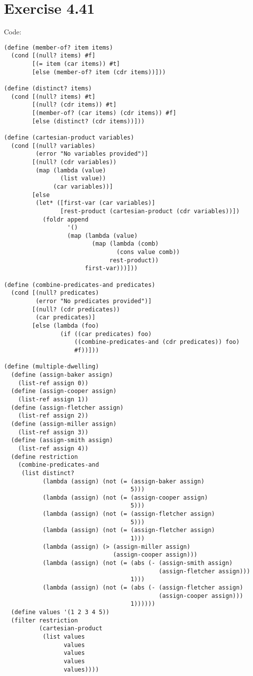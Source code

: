 \documentclass[../main.tex]{subfiles}
\begin{document}
\section{Exercise 4.41}

Code:

\begin{lstlisting}
(define (member-of? item items)
  (cond [(null? items) #f]
        [(= item (car items)) #t]
        [else (member-of? item (cdr items))]))

(define (distinct? items)
  (cond [(null? items) #t]
        [(null? (cdr items)) #t]
        [(member-of? (car items) (cdr items)) #f]
        [else (distinct? (cdr items))]))

(define (cartesian-product variables)
  (cond [(null? variables)
         (error "No variables provided")]
        [(null? (cdr variables))
         (map (lambda (value)
                (list value))
              (car variables))]
        [else
         (let* ([first-var (car variables)]
                [rest-product (cartesian-product (cdr variables))])
           (foldr append
                  '()
                  (map (lambda (value)
                         (map (lambda (comb)
                                (cons value comb))
                              rest-product))
                       first-var)))]))

(define (combine-predicates-and predicates)
  (cond [(null? predicates)
         (error "No predicates provided")]
        [(null? (cdr predicates))
         (car predicates)]
        [else (lambda (foo)
                (if ((car predicates) foo)
                    ((combine-predicates-and (cdr predicates)) foo)
                    #f))]))

(define (multiple-dwelling)
  (define (assign-baker assign)
    (list-ref assign 0))
  (define (assign-cooper assign)
    (list-ref assign 1))
  (define (assign-fletcher assign)
    (list-ref assign 2))
  (define (assign-miller assign)
    (list-ref assign 3))
  (define (assign-smith assign)
    (list-ref assign 4))
  (define restriction
    (combine-predicates-and
     (list distinct?
           (lambda (assign) (not (= (assign-baker assign)
                                    5)))
           (lambda (assign) (not (= (assign-cooper assign)
                                    5)))
           (lambda (assign) (not (= (assign-fletcher assign)
                                    5)))
           (lambda (assign) (not (= (assign-fletcher assign)
                                    1)))
           (lambda (assign) (> (assign-miller assign)
                               (assign-cooper assign)))
           (lambda (assign) (not (= (abs (- (assign-smith assign)
                                            (assign-fletcher assign)))
                                    1)))
           (lambda (assign) (not (= (abs (- (assign-fletcher assign)
                                            (assign-cooper assign)))
                                    1))))))
  (define values '(1 2 3 4 5))
  (filter restriction
          (cartesian-product
           (list values
                 values
                 values
                 values
                 values))))
\end{lstlisting}
\end{document}
